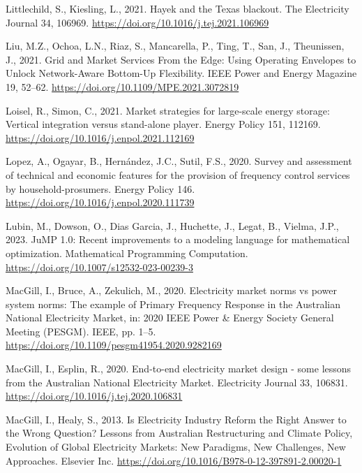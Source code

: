 \documentclass[12pt,a4paper,]{report}
\newlength{\cslhangindent}
\newenvironment{CSLReferences}[2] %
 {%
  \setlength{\parindent}{0pt}
  \ifodd #1 \everypar{\setlength{\hangindent}{\cslhangindent}}\ignorespaces\fi
  \ifnum #2 > 0
  \setlength{\parskip}{#2\baselineskip}
  \fi
 }%
 {}
\begin{document}
\begin{CSLReferences}{1}{0}
\leavevmode{}%
Littlechild, S., Kiesling, L., 2021. Hayek and the {Texas} blackout. The
Electricity Journal 34, 106969.
\url{https://doi.org/10.1016/j.tej.2021.106969}

\leavevmode{}%
Liu, M.Z., Ochoa, L.N., Riaz, S., Mancarella, P., Ting, T., San, J.,
Theunissen, J., 2021. Grid and {Market Services From} the {Edge}: {Using
Operating Envelopes} to {Unlock Network-Aware Bottom-Up Flexibility}.
IEEE Power and Energy Magazine 19, 52--62.
\url{https://doi.org/10.1109/MPE.2021.3072819}

\leavevmode{}%
Loisel, R., Simon, C., 2021. Market strategies for large-scale energy
storage: {Vertical} integration versus stand-alone player. Energy Policy
151, 112169. \url{https://doi.org/10.1016/j.enpol.2021.112169}

\leavevmode{}%
Lopez, A., Ogayar, B., Hernández, J.C., Sutil, F.S., 2020. Survey and
assessment of technical and economic features for the provision of
frequency control services by household-prosumers. Energy Policy 146.
\url{https://doi.org/10.1016/j.enpol.2020.111739}

\leavevmode{}%
Lubin, M., Dowson, O., Dias Garcia, J., Huchette, J., Legat, B., Vielma,
J.P., 2023. {JuMP} 1.0: {Recent} improvements to a modeling language for
mathematical optimization. Mathematical Programming Computation.
\url{https://doi.org/10.1007/s12532-023-00239-3}

\leavevmode{}%
MacGill, I., Bruce, A., Zekulich, M., 2020. Electricity market norms vs
power system norms: The example of {Primary Frequency Response} in the
{Australian National Electricity Market}, in: 2020 {IEEE Power} \&
{Energy Society General Meeting} ({PESGM}). {IEEE}, pp. 1--5.
\url{https://doi.org/10.1109/pesgm41954.2020.9282169}

\leavevmode{}%
MacGill, I., Esplin, R., 2020. End-to-end electricity market design -
some lessons from the {Australian National Electricity Market}.
Electricity Journal 33, 106831.
\url{https://doi.org/10.1016/j.tej.2020.106831}

\leavevmode{}%
MacGill, I., Healy, S., 2013. Is {Electricity Industry Reform} the
{Right Answer} to the {Wrong Question}? {Lessons} from {Australian
Restructuring} and {Climate Policy}, Evolution of Global Electricity
Markets: New Paradigms, New Challenges, New Approaches. {Elsevier Inc.}
\url{https://doi.org/10.1016/B978-0-12-397891-2.00020-1}


\end{CSLReferences}
\end{document}
